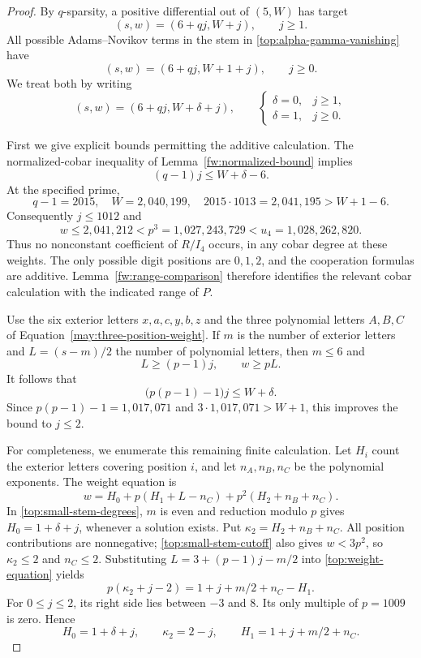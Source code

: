 \begin{proof}
By $q$-sparsity, a positive differential out of $(5,W)$ has target
\[
 (s,w)=(6+qj,W+j),\qquad j\geq 1.
\]
All possible Adams--Novikov terms in the stem in
\eqref{top:alpha-gamma-vanishing} have
\[
 (s,w)=(6+qj,W+1+j),\qquad j\geq 0.
\]
We treat both by writing
\begin{equation}
\label{top:small-stem-degrees}
 (s,w)=(6+qj,W+\delta+j),\qquad
 \begin{cases}
 \delta=0,&j\geq1,\\
 \delta=1,&j\geq0.
 \end{cases}
\end{equation}

First we give explicit bounds permitting the additive calculation.
The normalized-cobar inequality of Lemma~\ref{fw:normalized-bound}
implies
\[
 (q-1)j\leq W+\delta-6.
\]
At the specified prime,
\[
 q-1=2015,\quad W=2{,}040{,}199,\quad
 2015\cdot1013=2{,}041{,}195>W+1-6.
\]
Consequently $j\leq1012$ and
\begin{equation}
\label{top:small-stem-cutoff}
 w\leq2{,}041{,}212
 <p^3=1{,}027{,}243{,}729
 <u_4=1{,}028{,}262{,}820.
\end{equation}
Thus no nonconstant coefficient of $R/I_4$ occurs, in any cobar
degree at these weights. The only possible digit positions are
$0,1,2$, and the cooperation formulas are additive.
Lemma~\ref{fw:range-comparison} therefore identifies the relevant
cobar calculation with the indicated range of $P$.

Use the six exterior letters $x,a,c,y,b,z$ and the three polynomial
letters $A,B,C$ of Equation~\eqref{may:three-position-weight}.
If $m$ is the number of exterior letters and $L=(s-m)/2$ the number
of polynomial letters, then $m\leq6$ and
\[
 L\geq (p-1)j,\qquad w\geq pL.
\]
It follows that
\[
 \bigl(p(p-1)-1\bigr)j\leq W+\delta.
\]
Since $p(p-1)-1=1{,}017{,}071$ and
$3\cdot1{,}017{,}071>W+1$, this improves the bound to $j\leq2$.

For completeness, we enumerate this remaining finite calculation.
Let $H_i$ count the exterior letters covering position $i$, and let
$n_A,n_B,n_C$ be the polynomial exponents. The weight equation is
\begin{equation}
\label{top:weight-equation}
 w=H_0+p(H_1+L-n_C)+p^2(H_2+n_B+n_C).
\end{equation}
In \eqref{top:small-stem-degrees}, $m$ is even and reduction modulo
$p$ gives $H_0=1+\delta+j$, whenever a solution exists. Put
$\kappa_2=H_2+n_B+n_C$. All position contributions are nonnegative;
\eqref{top:small-stem-cutoff} also gives $w<3p^2$, so
$\kappa_2\leq2$ and $n_C\leq2$. Substituting
$L=3+(p-1)j-m/2$ into \eqref{top:weight-equation} yields
\[
 p(\kappa_2+j-2)=1+j+m/2+n_C-H_1.
\]
For $0\leq j\leq2$, its right side lies between $-3$ and $8$.
Its only multiple of $p=1009$ is zero. Hence
\begin{equation}
\label{top:small-stem-coverage}
 H_0=1+\delta+j,\qquad \kappa_2=2-j,\qquad
 H_1=1+j+m/2+n_C.
\end{equation}


\end{proof}
